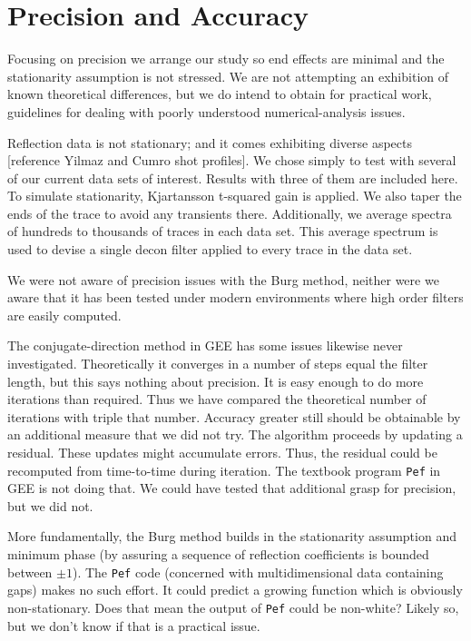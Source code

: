 \section{Precision and Accuracy}
Focusing on precision we arrange our study so end effects are minimal
and the stationarity assumption is not stressed.
We are not attempting an exhibition of known theoretical differences,
but we do intend to obtain for practical work,
guidelines for dealing with poorly understood numerical-analysis issues.



Reflection data is not stationary;
and it comes exhibiting diverse aspects [reference Yilmaz and Cumro shot profiles].
We chose simply to test with several of our current data sets of interest.
Results with three of them are included here.
To simulate stationarity, Kjartansson t-squared gain is applied.
We also taper the ends of the trace to avoid any transients there.
Additionally,
we average spectra of hundreds to thousands of traces in each data set.
This average spectrum is used to devise a single decon filter
applied to every trace in the data set.

We were not aware of precision issues with the Burg method,
neither were we aware that
it has been tested under modern environments
where high order filters are easily computed.

The conjugate-direction method in GEE has some issues likewise never investigated.
Theoretically it converges in a number of steps equal the filter length,
but this says nothing about precision.
It is easy enough to do more iterations than required.
Thus we have compared the theoretical number of iterations
with triple that number.
Accuracy greater still should be obtainable by an additional measure that we did not try.
The algorithm proceeds by updating a residual.
These updates might accumulate errors.
Thus, the residual could be recomputed from time-to-time during iteration.
The textbook program \texttt{Pef} in GEE is not doing that.
We could have tested that additional grasp for precision, but we did not.

More fundamentally,
the Burg method builds in the stationarity assumption and minimum phase
(by assuring a sequence of reflection coefficients is bounded between $\pm 1$).
The \texttt{Pef} code
(concerned with multidimensional data containing gaps) makes no such effort.
It could predict a growing function which is obviously non-stationary.
Does that mean the output of \texttt{Pef} could be non-white?
Likely so, but we don't know if that is a practical issue.

